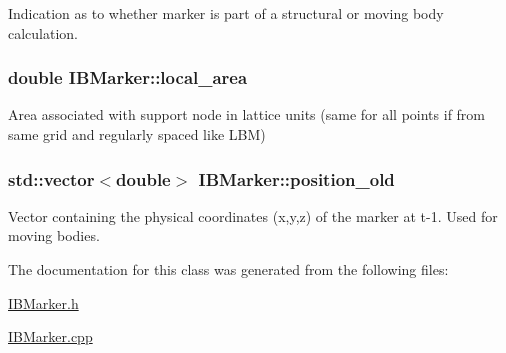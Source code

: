 Indication as to whether marker is part of a structural or moving body calculation. 

\subsubsection[{\texorpdfstring{local\+\_\+area}{local_area}}]{\setlength{\rightskip}{0pt plus 5cm}double I\+B\+Marker\+::local\+\_\+area\hspace{0.3cm}{\ttfamily [protected]}}\hypertarget{class_i_b_marker_aa332dcba1676eae4fbb6d0fa6caca809}{}\label{class_i_b_marker_aa332dcba1676eae4fbb6d0fa6caca809}


Area associated with support node in lattice units (same for all points if from same grid and regularly spaced like L\+BM) 

\subsubsection[{\texorpdfstring{position\+\_\+old}{position_old}}]{\setlength{\rightskip}{0pt plus 5cm}std\+::vector$<$double$>$ I\+B\+Marker\+::position\+\_\+old\hspace{0.3cm}{\ttfamily [protected]}}\hypertarget{class_i_b_marker_a6a55fe2293f288ae339036ea4a3bc7df}{}\label{class_i_b_marker_a6a55fe2293f288ae339036ea4a3bc7df}


Vector containing the physical coordinates (x,y,z) of the marker at t-\/1. Used for moving bodies. 



The documentation for this class was generated from the following files\+:\begin{DoxyCompactItemize}
\item 
\hyperlink{_i_b_marker_8h}{I\+B\+Marker.\+h}\item 
\hyperlink{_i_b_marker_8cpp}{I\+B\+Marker.\+cpp}\end{DoxyCompactItemize}
